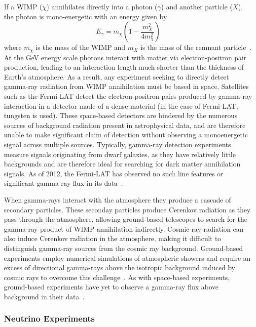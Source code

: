 If a WIMP ($\chi$) annihilates directly into a photon ($\gamma$) and another particle ($X$), the photon is mono-energetic with an energy given by
\begin{equation} \label{WIMP-penergy}
E_{\gamma} = m_{\chi} \left(1-\frac{m_X^2}{4m_\chi^2} \right)
\end{equation}
where $m_\chi$ is the mass of the WIMP and $m_X$ is the mass of the remnant particle~\cite{Fermit-LAT}. At the GeV energy scale photons interact with matter via electron-positron pair production, leading to an interaction length much shorter than the thickness of Earth's atmosphere.  As a result, any experiment seeking to directly detect gamma-ray radiation from WIMP annihilation must be based in space.  Satellites such as the Fermi-LAT detect the electron-positron pairs produced by gamma-ray interaction in a detector made of a dense material (in the case of Fermi-LAT, tungsten is used).  These space-based detectors are hindered by the numerous sources of background radiation present in astrophysical data, and are therefore unable to make significant claim of detection without observing a monoenergetic signal across multiple sources.  Typically, gamma-ray detection experiments measure signals originating from dwarf galaxies, as they have relatively little backgrounds and are therefore ideal for searching for dark matter annihilation signals.   As of 2012, the Fermi-LAT has observed no such line features or significant gamma-ray flux in its data~\cite{Fermi-LAT}. 

When gamma-rays interact with the atmosphere they produce a cascade of secondary particles.  These seconday particles produce Cerenkov radiation as they pass through the atmosphere, allowing ground-based telescopes to search for the gamma-ray product of WIMP annihilation indirectly.  Cosmic ray radiation can also induce Cerenkov radiation in the atmosphere, making it difficult to distinguish gamma-ray sources from the cosmic ray background.  Ground-based experiments employ numerical simulations of atmospheric showers and require an excess of directional gamma-rays above the isotropic background induced by cosmic rays to overcome this challenge~\cite{Knapp}.  As with space-based experiments, ground-based experiments have yet to observe a gamma-ray flux above background in their data~\cite{HESS}.

\subsubsection{Neutrino Experiments}

